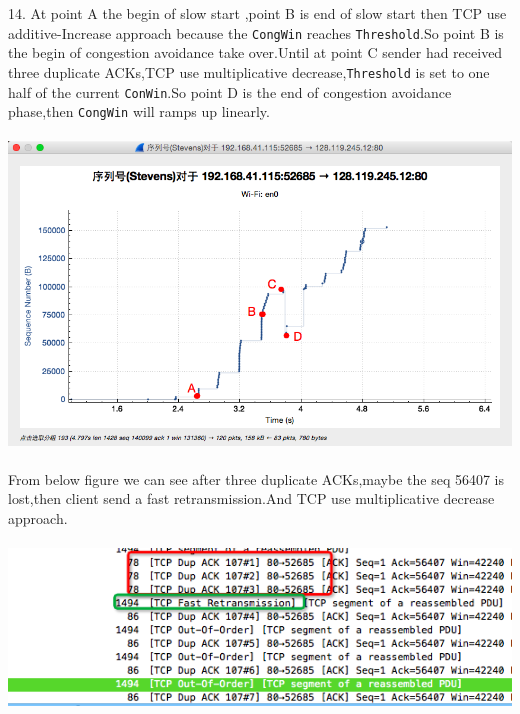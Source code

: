 \documentclass[a4paper]{article}
\begin{document}
{	14. At point A the begin of slow start ,point B is end of slow start then TCP use additive-Increase approach because the \verb|CongWin| reaches \verb|Threshold|.So point B is the begin of congestion avoidance take over.Until at point C sender had received three duplicate ACKs,TCP use multiplicative decrease,\verb|Threshold| is set to one half of the current \verb|ConWin|.So point D is the end of congestion avoidance phase,then \verb|CongWin| will ramps up linearly.\\\\ 
	{\centering\includegraphics[scale=0.5]{Illustrations/13_2.png}}\\\\
	From below figure we can see after three duplicate ACKs,maybe the seq 56407 is lost,then client send a fast retransmission.And TCP use multiplicative decrease 
	approach.		\\\\
	{\centering\includegraphics[scale=0.5]{Illustrations/13_1.png}}\\\\





}

\end{document}

